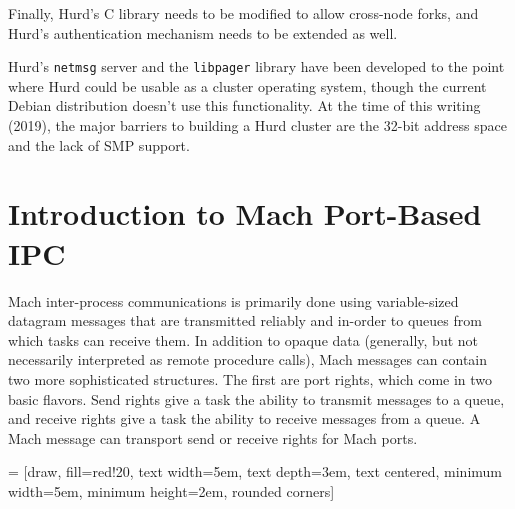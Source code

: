 \documentclass{article}
\def\libpager{{\tt libpager}\xspace}
\def\netmsg{{\tt netmsg}\xspace}
\begin{document}
Finally, Hurd's C library needs to be modified to allow cross-node
forks, and Hurd's authentication mechanism needs to be extended
as well.

Hurd's \netmsg server and the \libpager library have been developed
to the point where Hurd could be usable as a cluster operating system,
though the current Debian distribution doesn't use this functionality.
At the time of this writing (2019), the major barriers to building a
Hurd cluster are the 32-bit address space and the lack of SMP support.

\section{Introduction to Mach Port-Based IPC}

Mach inter-process communications is primarily done using
variable-sized datagram messages that are transmitted reliably and
in-order to queues from which tasks can receive them.  In addition to
opaque data (generally, but not necessarily interpreted as remote
procedure calls), Mach messages can contain two more sophisticated
structures.  The first are port rights, which come in two basic
flavors.  Send rights give a task the ability to transmit messages to
a queue, and receive rights give a task the ability to receive
messages from a queue.  A Mach message can transport send or receive
rights for Mach ports.

 = [draw, fill=red!20, text width=5em, text depth=3em, text centered,
  minimum width=5em, minimum height=2em, rounded corners]
\end{document}
